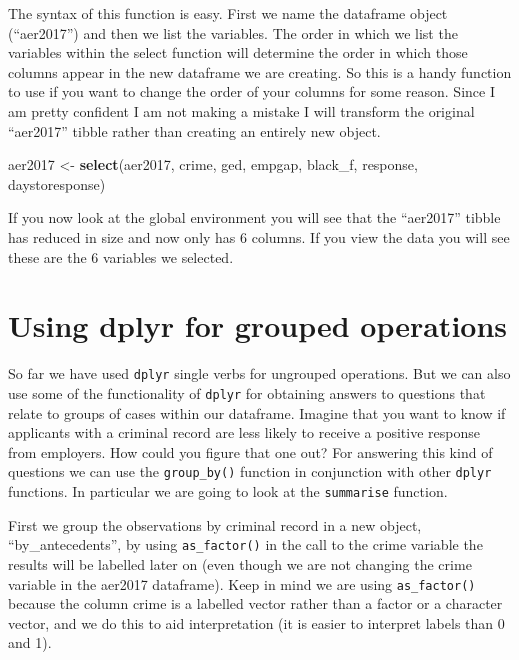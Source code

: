 \documentclass[
]{book}
\newenvironment{Shaded}{\begin{snugshade}}{\end{snugshade}}
\newcommand{\FunctionTok}[1]{\textcolor[rgb]{0.13,0.29,0.53}{\textbf{#1}}}
\newcommand{\NormalTok}[1]{#1}
\newcommand{\OtherTok}[1]{\textcolor[rgb]{0.56,0.35,0.01}{#1}}
\begin{document}
The syntax of this function is easy. First we name the dataframe object (``aer2017'') and then we list the variables. The order in which we list the variables within the select function will determine the order in which those columns appear in the new dataframe we are creating. So this is a handy function to use if you want to change the order of your columns for some reason. Since I am pretty confident I am not making a mistake I will transform the original ``aer2017'' tibble rather than creating an entirely new object.

\begin{Shaded}
\begin{Highlighting}[]
\NormalTok{aer2017 }\OtherTok{\textless{}{-}} \FunctionTok{select}\NormalTok{(aer2017, crime, ged, empgap, black\_f, response, daystoresponse)}
\end{Highlighting}
\end{Shaded}

If you now look at the global environment you will see that the ``aer2017'' tibble has reduced in size and now only has 6 columns. If you view the data you will see these are the 6 variables we selected.

\section{Using dplyr for grouped operations}\label{using-dplyr-for-grouped-operations}

So far we have used \texttt{dplyr} single verbs for ungrouped operations. But we can also use some of the functionality of \texttt{dplyr} for obtaining answers to questions that relate to groups of cases within our dataframe. Imagine that you want to know if applicants with a criminal record are less likely to receive a positive response from employers. How could you figure that one out? For answering this kind of questions we can use the \texttt{group\_by()} function in conjunction with other \texttt{dplyr} functions. In particular we are going to look at the \texttt{summarise} function.

First we group the observations by criminal record in a new object, ``by\_antecedents'', by using \texttt{as\_factor()} in the call to the crime variable the results will be labelled later on (even though we are not changing the crime variable in the aer2017 dataframe). Keep in mind we are using \texttt{as\_factor()} because the column crime is a labelled vector rather than a factor or a character vector, and we do this to aid interpretation (it is easier to
interpret labels than 0 and 1).
\end{document}
